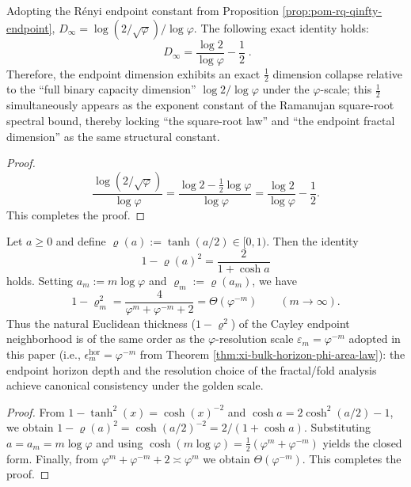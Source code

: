 \begin{corollary}\label{cor:discussion-ramanujan-half-dimension-collapse}
Adopting the R\'enyi endpoint constant from Proposition \ref{prop:pom-rq-qinfty-endpoint},
\(
D_\infty=\log(2/\sqrt{\varphi})/\log\varphi
\).
The following exact identity holds:
\[
\boxed{\;
D_\infty=\frac{\log 2}{\log\varphi}-\frac12\; }.
\]
Therefore, the endpoint dimension exhibits an exact \(\tfrac12\) dimension collapse relative to the ``full binary capacity dimension'' \(\log 2/\log\varphi\) under the \(\varphi\)-scale; this \(\tfrac12\) simultaneously appears as the exponent constant of the Ramanujan square-root spectral bound, thereby locking ``the square-root law'' and ``the endpoint fractal dimension'' as the same structural constant.
\end{corollary}
\begin{proof}
\[
\frac{\log(2/\sqrt{\varphi})}{\log\varphi}
=\frac{\log 2-\tfrac12\log\varphi}{\log\varphi}
=\frac{\log 2}{\log\varphi}-\frac12.
\]
This completes the proof.
\end{proof}

\begin{corollary}\label{cor:discussion-horizon-boundarylayer-phi-scaling}
Let \(a\ge 0\) and define \(\varrho(a):=\tanh(a/2)\in[0,1)\). Then the identity
\[
1-\varrho(a)^2=\frac{2}{1+\cosh a}
\]
holds. Setting \(a_m:=m\log\varphi\) and \(\varrho_m:=\varrho(a_m)\), we have
\[
1-\varrho_m^2=\frac{4}{\varphi^{m}+\varphi^{-m}+2}
=\Theta(\varphi^{-m})\qquad(m\to\infty).
\]
Thus the natural Euclidean thickness (\(1-\varrho^2\)) of the Cayley endpoint neighborhood is of the same order as the \(\varphi\)-resolution scale \(\varepsilon_m=\varphi^{-m}\) adopted in this paper (i.e., \(\epsilon_m^{\mathrm{hor}}=\varphi^{-m}\) from Theorem \ref{thm:xi-bulk-horizon-phi-area-law}): the endpoint horizon depth and the resolution choice of the fractal/fold analysis achieve canonical consistency under the golden scale.
\end{corollary}
\begin{proof}
From \(1-\tanh^2(x)=\cosh(x)^{-2}\) and \(\cosh a=2\cosh^2(a/2)-1\), we obtain
\(
1-\varrho(a)^2=\cosh(a/2)^{-2}=2/(1+\cosh a)
\).
Substituting \(a=a_m=m\log\varphi\) and using \(\cosh(m\log\varphi)=\frac12(\varphi^{m}+\varphi^{-m})\) yields the closed form.
Finally, from \(\varphi^{m}+\varphi^{-m}+2\asymp\varphi^{m}\) we obtain \(\Theta(\varphi^{-m})\). This completes the proof.
\end{proof}

